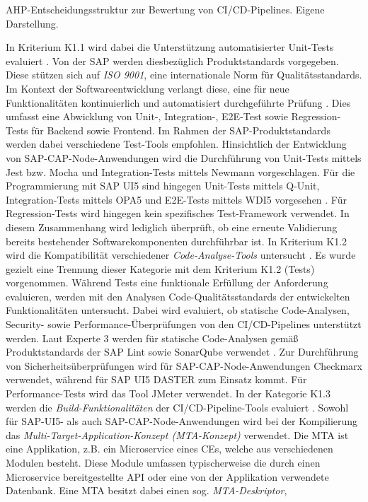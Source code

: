  \begin{center}
	\begin{table}[H]
		\centering
		\caption[AHP-Entscheidungsstruktur zur Bewertung von CI/CD-Pipelines]{AHP-Entscheidungsstruktur zur Bewertung von CI/CD-Pipelines. Eigene Darstellung.}
		\label{fig:AHP_E}
	\end{table}
\end{center}
\vspace*{-15mm}
In Kriterium K1.1 wird dabei die Unterstützung automatisierter Unit-Tests evaluiert \cite[Z. 72 ff.]{ProductOwnerSAPBTPProd&Infra.}. Von der SAP werden diesbezüglich Produktstandards vorgegeben. Diese stützen sich auf \textit{ISO 9001}, eine internationale Norm für Qualitätsstandards. Im Kontext der Softwareentwicklung verlangt diese, eine für neue Funktionalitäten kontinuierlich und automatisiert durchgeführte Prüfung \cite[Z. 65 ff.]{TestDeveloperSAPHyperspaceAdoption&Onboarding.b}. Dies umfasst eine Abwicklung von Unit-, Integration-, E2E-Test sowie Regression-Tests für Backend sowie Frontend. Im Rahmen der SAP-Produktstandards werden dabei verschiedene Test-Tools empfohlen. Hinsichtlich der Entwicklung von SAP-CAP-Node-Anwendungen wird die Durchführung von Unit-Tests mittels Jest bzw. Mocha und Integration-Tests mittels Newmann vorgeschlagen. Für die Programmierung mit SAP UI5 sind hingegen Unit-Tests mittels Q-Unit, Integration-Tests mittels OPA5 und E2E-Tests mittels WDI5 vorgesehen \cite[Z. 66 ff.]{TestDeveloperSAPHyperspaceAdoption&Onboarding.b}. Für Regression-Tests wird hingegen kein spezifisches Test-Framework verwendet. In diesem Zusammenhang wird lediglich überprüft, ob eine erneute Validierung bereits bestehender Softwarekomponenten durchführbar ist. In Kriterium K1.2 wird die Kompatibilität verschiedener \textit{Code-Analyse-Tools} untersucht \cite[Z. 72 ff.]{ProductOwnerSAPBTPProd&Infra.}. Es wurde gezielt eine Trennung dieser Kategorie mit dem Kriterium K1.2 (Tests) vorgenommen. Während Tests eine funktionale Erfüllung der Anforderung evaluieren, werden  mit den Analysen Code-Qualitätsstandards der entwickelten Funktionalitäten untersucht. Dabei wird evaluiert, ob statische Code-Analysen, Security- sowie Performance-Überprüfungen von den CI/CD-Pipelines unterstützt werden. Laut Experte 3 werden für statische Code-Analysen gemäß Produktstandards der SAP Lint sowie SonarQube verwendet \cite[Z. 44 ff.]{ProductManagerSAPHyperspaceSecurityTools.}. Zur Durchführung von Sicherheitsüberprüfungen wird für SAP-CAP-Node-Anwendungen Checkmarx verwendet, während für SAP UI5 DASTER zum Einsatz kommt. Für Performance-Tests wird das Tool JMeter verwendet. In der Kategorie K1.3 werden die \textit{Build-Funktionalitäten} der CI/CD-Pipeline-Tools evaluiert \cite[Z. 71 ff.]{ProductOwnerSAPBTPProd&Infra.}. Sowohl für SAP-UI5- als auch SAP-CAP-Node-Anwendungen wird bei der Kompilierung das \textit{Multi-Target-Application-Konzept (\acs{MTA}-Konzept)} verwendet. Die MTA ist eine Applikation, z.B. ein Microservice eines CEs, welche aus verschiedenen Modulen besteht. Diese Module umfassen typischerweise die durch einen Microservice bereitgestellte API oder eine von der Applikation verwendete Datenbank. Eine MTA besitzt dabei einen sog. \textit{MTA-Deskriptor}, 
